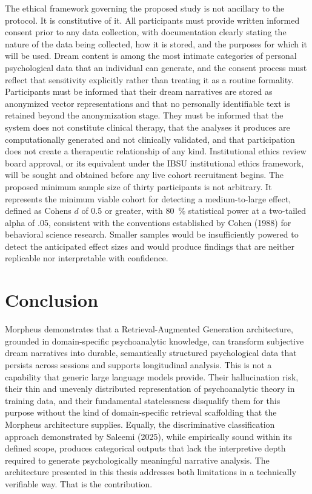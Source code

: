 \documentclass[12pt,a4paper]{report}
\begin{document}
The ethical framework governing the proposed study is not ancillary to the protocol. It is constitutive of it. All participants must provide written informed consent prior to any data collection, with documentation clearly stating the nature of the data being collected, how it is stored, and the purposes for which it will be used. Dream content is among the most intimate categories of personal psychological data that an individual can generate, and the consent process must reflect that sensitivity explicitly rather than treating it as a routine formality. Participants must be informed that their dream narratives are stored as anonymized vector representations and that no personally identifiable text is retained beyond the anonymization stage. They must be informed that the system does not constitute clinical therapy, that the analyses it produces are computationally generated and not clinically validated, and that participation does not create a therapeutic relationship of any kind. Institutional ethics review board approval, or its equivalent under the IBSU institutional ethics framework, will be sought and obtained before any live cohort recruitment begins. The proposed minimum sample size of thirty participants is not arbitrary. It represents the minimum viable cohort for detecting a medium-to-large effect, defined as Cohen\textquotesingle{}s $d$ of 0.5 or greater, with \SI{80}{\percent} statistical power at a two-tailed alpha of .05, consistent with the conventions established by Cohen (1988) for behavioral science research. Smaller samples would be insufficiently powered to detect the anticipated effect sizes and would produce findings that are neither replicable nor interpretable with confidence.

\chapter*{Conclusion}
Morpheus demonstrates that a Retrieval-Augmented Generation architecture, grounded in domain-specific psychoanalytic knowledge, can transform subjective dream narratives into durable, semantically structured psychological data that persists across sessions and supports longitudinal analysis. This is not a capability that generic large language models provide. Their hallucination risk, their thin and unevenly distributed representation of psychoanalytic theory in training data, and their fundamental statelessness disqualify them for this purpose without the kind of domain-specific retrieval scaffolding that the Morpheus architecture supplies. Equally, the discriminative classification approach demonstrated by Saleemi (2025), while empirically sound within its defined scope, produces categorical outputs that lack the interpretive depth required to generate psychologically meaningful narrative analysis. The architecture presented in this thesis addresses both limitations in a technically verifiable way. That is the contribution.
\end{document}
